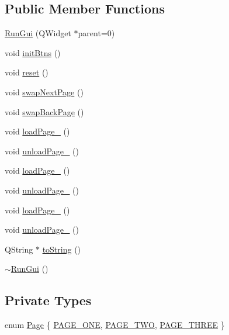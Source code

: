 \subsection*{Public Member Functions}
\begin{DoxyCompactItemize}
\item 
\hyperlink{class_run_gui_af41e6138b6401d18ff8a3f8db680cd43}{Run\-Gui} (Q\-Widget $\ast$parent=0)
\item 
void \hyperlink{class_run_gui_ad78d722a104e6e893b57642340c3b937}{init\-Btns} ()
\item 
void \hyperlink{class_run_gui_ac732d44ad96c7d14f1666d1193c43d65}{reset} ()
\item 
void \hyperlink{class_run_gui_ac4c0fed5ead22a1dc40d5bebe2d6f176}{swap\-Next\-Page} ()
\item 
void \hyperlink{class_run_gui_a469be74273ddc6441a9f87e65d3ab2c9}{swap\-Back\-Page} ()
\item 
void \hyperlink{class_run_gui_a381d265f46ec8473a7858974a19674c5}{load\-Page\-\_} ()
\item 
void \hyperlink{class_run_gui_ab68852933855016b114c795ab494d8bb}{unload\-Page\-\_} ()
\item 
void \hyperlink{class_run_gui_a8048ffff4b07771419e8c88ea250d2f2}{load\-Page\-\_} ()
\item 
void \hyperlink{class_run_gui_a3192d643a700244e066f3e0ca4389c4b}{unload\-Page\-\_} ()
\item 
void \hyperlink{class_run_gui_a5defb3e688b1b3f22d50c5b9389910c0}{load\-Page\-\_} ()
\item 
void \hyperlink{class_run_gui_a410e373ff032fb779b52b1dd501c3128}{unload\-Page\-\_} ()
\item 
Q\-String $\ast$ \hyperlink{class_run_gui_a4a3470c32bf986ad552bc225d039e5bb}{to\-String} ()
\item 
\hyperlink{class_run_gui_a22945ade9579f8d0e44f848c51a0a0b0}{$\sim$\-Run\-Gui} ()
\end{DoxyCompactItemize}
\subsection*{Private Types}
\begin{DoxyCompactItemize}
\item 
enum \hyperlink{class_run_gui_acb4a3da6e31619ee4b0ac8c8f9cb64a3}{Page} \{ \hyperlink{class_run_gui_acb4a3da6e31619ee4b0ac8c8f9cb64a3aad59b834aebc523b21fc270d5d5fa41e}{P\-A\-G\-E\-\_\-\-O\-N\-E}, 
\hyperlink{class_run_gui_acb4a3da6e31619ee4b0ac8c8f9cb64a3a141aac6dec6d5f36540fcaf2fe34f343}{P\-A\-G\-E\-\_\-\-T\-W\-O}, 
\hyperlink{class_run_gui_acb4a3da6e31619ee4b0ac8c8f9cb64a3a58cde07651bfba4a62997dc50a95fba1}{P\-A\-G\-E\-\_\-\-T\-H\-R\-E\-E}
 \}
\end{DoxyCompactItemize}

